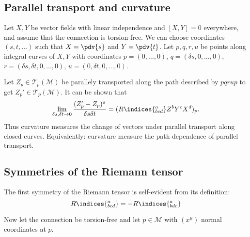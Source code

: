 \documentclass{jknotes}
\begin{document}
\subsection{Parallel transport and curvature}
Let \(X,Y\) be vector fields with linear independence and \([X,Y]=0\) everywhere, and assume that the connection is torsion-free. We can choose coordinates \((s,t,\dots)\) such that \(X=\pdv{s}\) and \(Y = \pdv{t}\). Let \(p,q,r,u\) be points along integral curves of \(X,Y\) with coordinates \(p = (0,\dots,0)\), \(q = (\delta s,0,\dots,0)\), \(r = (\delta s,\delta t,0,\dots,0)\), \(u = (0,\delta t,0,\dots,0)\).
\begin{figure}[H]
    \centering
\end{figure}
Let \(Z_p\in\mathcal{T}_p(\mathcal{M})\) be parallely transported along the path described by \(pqrup\) to get \(Z_p'\in\mathcal{T}_p(\mathcal{M})\). It can be shown that
\begin{equation}
    \lim_{\delta s,\delta t\to0} \frac{(Z_p'-Z_p)^a}{\delta s\delta t} = (R\indices{^a_{bcd}}Z^bY^cX^d)_p.
\end{equation}
Thus curvature measures the change of vectors under parallel transport along closed curves. Equivalently: curvature measure the path dependence of parallel transport.

\subsection{Symmetries of the Riemann tensor}
The first symmetry of the Riemann tensor is self-evident from its definition:
\begin{equation}
    R\indices{^a_{bcd}} = - R\indices{^a_{bdc}}
\end{equation}

Now let the connection be torsion-free and let \(p\in\mathcal{M}\) with \((x^\mu)\) normal coordinates at \(p\).
\end{document}
